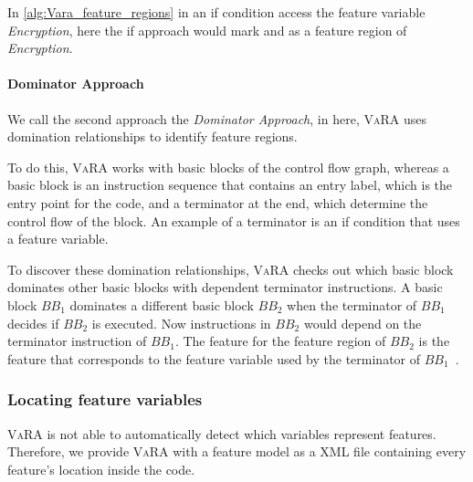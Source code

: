 In \autoref{alg:Vara_feature_regions} in  an if condition access the feature variable \emph{Encryption}, 
here the if approach would mark  and  as a feature region of \emph{Encryption}.

\paragraph{Dominator Approach}
We call the second approach the \emph{Dominator Approach}, in here, \textsc{VaRA} uses domination relationships to identify feature regions.

To do this, \textsc{VaRA} works with basic blocks of the control flow graph, whereas a basic block is an instruction sequence that contains an entry label, 
which is the entry point for the code, and a terminator at the end, which determine the control flow of the block. 
An example of a terminator is an if condition that uses a feature variable.

To discover these domination relationships, \textsc{VaRA} checks out which basic block dominates other basic blocks with dependent terminator instructions. 
A basic block $BB_1$ dominates a different basic block $BB_2$ when the terminator of $BB_1$ decides if $BB_2$ is executed. 
Now instructions in $BB_2$ would depend on the terminator instruction of $BB_1$. 
The feature for the feature region of $BB_2$ is the feature that corresponds to the feature variable used by the terminator of $BB_1$~\cite{VaRA-Tom}.


\subsubsection{Locating feature variables}
\textsc{VaRA} is not able to automatically detect which variables represent features. 
Therefore, we provide \textsc{VaRA} with a feature model as a \textsc{XML} file containing every feature's location inside the code.

